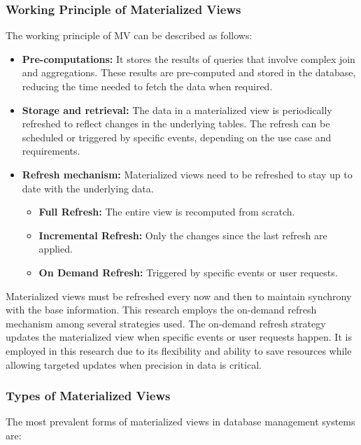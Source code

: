 \subsubsection{Working Principle of Materialized Views}
The working principle of MV can be described as follows:

\begin{itemize}
    \item\textbf{Pre-computations:} It stores the results of queries that involve complex join and aggregations. These results are pre-computed and stored in the database, reducing the time needed to fetch the data when required.
    \item\textbf{Storage and retrieval:} The data in a materialized view is periodically refreshed to reflect changes in the underlying tables. The refresh can be scheduled or triggered by specific events, depending on the use case and requirements.
    \item\textbf{Refresh mechanism:}  Materialized views need to be refreshed to stay up to date with the underlying data.\vspace{.4cm}

    \begin{itemize}
        \item\textbf{Full Refresh:} The entire view is recomputed from scratch.
        \item\textbf{Incremental Refresh:} Only the changes since the last refresh are applied.
        \item\textbf{On Demand Refresh:} Triggered by specific events or user requests.
    \end{itemize}
 
\end{itemize}\vspace{.4cm}

Materialized views must be refreshed every now and then to maintain synchrony with the base information. This research employs the on-demand refresh mechanism among several strategies used. The on-demand refresh strategy updates the materialized view when specific events or user requests happen. It is employed in this research due to its flexibility and ability to save resources while allowing targeted updates when precision in data is critical.

\subsubsection{Types of Materialized Views}
The most prevalent forms of materialized views in database management systems are:

